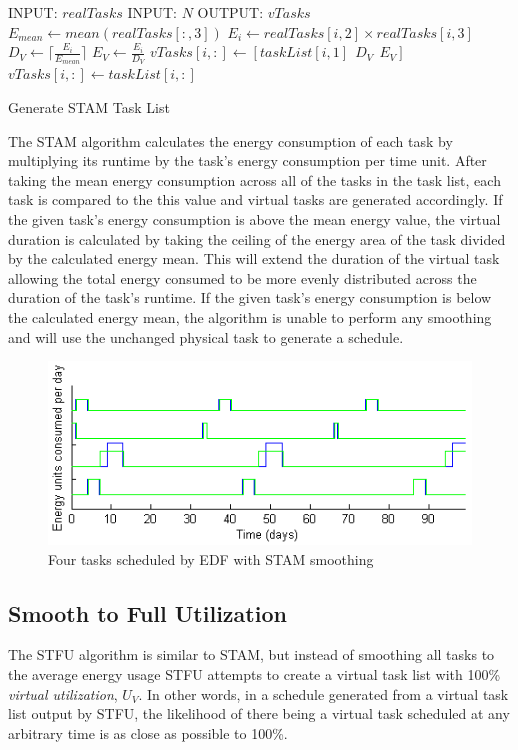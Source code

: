 \begin{algorithm}[htb]
\label{stamalg}
\begin{algorithmic}
\STATE INPUT: $realTasks$  
\STATE INPUT: $N$ 
\STATE OUTPUT: $vTasks$ 
\STATE $E_{mean} \gets mean(realTasks[:,3])$
\STATE $E_i \gets realTasks[i, 2] \times realTasks[i,3]$
\STATE $D_V \gets \lceil \frac{E_i}{E_{mean}} \rceil$
\STATE $E_V \gets \frac{E_i}{D_V}$
\STATE $vTasks[i,:] \gets [taskList[i,1]~~D_V~~E_V]$
\ELSE
\STATE $vTasks[i,:] \gets taskList[i,:]$
\ENDIF
\ENDFOR
\end{algorithmic}
\caption{Generate \textsc{STAM} Task List}
\end{algorithm}

The \textsc{STAM} algorithm calculates the energy consumption of each task by multiplying its runtime by the task's energy consumption per time unit. After taking the mean energy consumption across all of the tasks in the task list, each task is compared to the this value and virtual tasks are generated accordingly. If the given task's energy consumption is above the mean energy value, the virtual duration is calculated by taking the ceiling of the energy area of the task divided by the calculated energy mean. This will extend the duration of the virtual task allowing the total energy consumed to be more evenly distributed across the duration of the task's runtime. If the given task's energy consumption is below the calculated energy mean, the algorithm is unable to perform any smoothing and  will use the unchanged physical task to generate a schedule.
\begin{figure}[htb]
\includegraphics[scale=0.72]{stamtasks.png}
\caption{Four tasks scheduled by EDF with STAM smoothing}
\label{fig:stamtaskplot}
\end{figure}

\subsection{Smooth to Full Utilization}
The \textsc{STFU} algorithm is similar to STAM, but instead of smoothing all tasks to the average energy usage \textsc{STFU} attempts to create a virtual task list with 100\% \emph{virtual utilization}, $U_V$.  In other words, in a schedule generated from a virtual task list output by \textsc{STFU}, the likelihood of there being a virtual task scheduled at any arbitrary time is as close as possible to 100\%.

